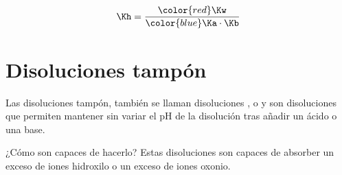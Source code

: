     \begin{equation*}
        \Kh = \dfrac{{\color{red}\Kw}}{{\color{blue}\Ka \cdot \Kb}}
    \end{equation*}


    \section{Disoluciones tampón}\label{sec:disoluciones-tampon}

    Las disoluciones tampón, también se llaman disoluciones ,  o  y son disoluciones que permiten mantener sin variar el pH de la disolución tras añadir un ácido o una base.

    ¿Cómo son capaces de hacerlo?
    Estas disoluciones son capaces de absorber un exceso de iones hidroxilo o un exceso de iones oxonio.

